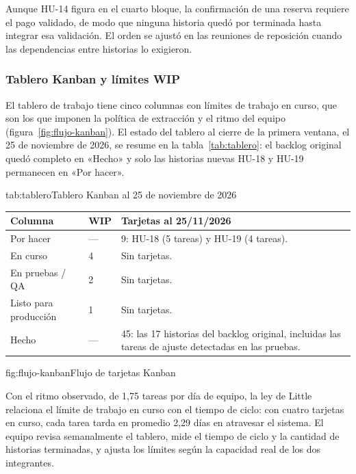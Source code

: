 Aunque HU-14 figura en el cuarto bloque, la confirmación de una reserva
requiere el pago validado, de modo que ninguna historia quedó por terminada
hasta integrar esa validación. El orden se ajustó en las reuniones de
reposición cuando las dependencias entre historias lo exigieron.

\subsubsection{Tablero Kanban y límites WIP}

El tablero de trabajo tiene cinco columnas con límites de trabajo en curso,
que son los que imponen la política de extracción y el ritmo del equipo
(figura~\ref{fig:flujo-kanban}). El estado del tablero al cierre de la
primera ventana, el 25 de noviembre de 2026, se resume en la
tabla~\ref{tab:tablero}: el backlog original quedó completo en «Hecho» y solo
las historias nuevas HU-18 y HU-19 permanecen en «Por hacer».

\begin{tablaapa}{tab:tablero}{Tablero Kanban al 25 de noviembre de 2026}
\small
\begin{tabular}{@{}p{4.6cm}p{1.6cm}p{7.8cm}@{}}
\toprule
Columna & WIP & Tarjetas al 25/11/2026 \\
\midrule
Por hacer & --- & 9: HU-18 (5 tareas) y HU-19 (4 tareas). \\
En curso & 4 & Sin tarjetas. \\
En pruebas / QA & 2 & Sin tarjetas. \\
Listo para producción & 1 & Sin tarjetas. \\
Hecho & --- & 45: las 17 historias del backlog original, incluidas las
tareas de ajuste detectadas en las pruebas. \\
\bottomrule
\end{tabular}
\end{tablaapa}

\begin{figuraapa}{fig:flujo-kanban}{Flujo de tarjetas Kanban}
\end{figuraapa}

Con el ritmo observado, de 1,75 tareas por día de equipo, la ley de Little
relaciona el límite de trabajo en curso con el tiempo de ciclo: con cuatro
tarjetas en curso, cada tarea tarda en promedio 2,29 días en atravesar el
sistema. El equipo revisa semanalmente el tablero, mide el tiempo de ciclo y
la cantidad de historias terminadas, y ajusta los límites según la capacidad
real de los dos integrantes.

